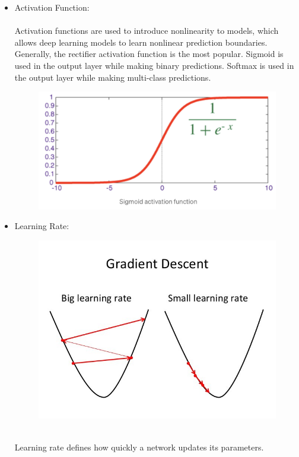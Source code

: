 \documentclass[a4paper, 12pt]{article}
\begin{document}
\begin{itemize}
\item Activation Function:
\\ \\ Activation functions are used to introduce nonlinearity to models, which allows deep learning models to learn nonlinear prediction boundaries.
Generally, the rectifier activation function is the most popular.
Sigmoid is used in the output layer while making binary predictions. Softmax is used in the output layer while making multi-class predictions.
\begin{figure}[h]
\includegraphics[scale=.43]{3.png}
\centering
\end{figure}
\item Learning Rate:
\begin{figure}[h]
\includegraphics[scale=.43]{4.jpeg}
\centering
\end{figure}
\\
Learning rate defines how quickly a network updates its parameters.

\end{itemize}
\end{document}
